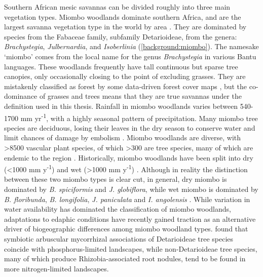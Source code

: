 \begin{refsection}
Southern African mesic savannas can be divided roughly into three main vegetation types. Miombo woodlands dominate southern Africa, and are the largest savanna vegetation type in the world by area \citep{Ryan2011}. They are dominated by species from the Fabaceae family, subfamily Detarioideae, from the genera: \textit{Brachystegia}, \textit{Julbernardia}, and \textit{Isoberlinia} (\autoref{background:miombo}). The namesake `miombo' comes from the local name for the genus \textit{Brachystegia} in various Bantu languages. These woodlands frequently have tall continuous but sparse tree canopies, only occasionally closing to the point of excluding grasses. They are mistakenly classified as forest by some data-driven forest cover maps \citep{Hansen2013}, but the co-dominance of grasses and trees means that they are true savannas under the definition used in this thesis. Rainfall in miombo woodlands varies between 540-1700 mm yr\textsuperscript{-1}, with a highly seasonal pattern of precipitation. Many miombo tree species are deciduous, losing their leaves in the dry season to conserve water and limit chances of damage by embolism \citep{Tomlinson2013}. Miombo woodlands are diverse, with >8500 vascular plant species, of which >300 are tree species, many of which are endemic to the region \citep{Frost1996}. Historically, miombo woodlands have been split into dry (<1000 mm y\textsuperscript{-1}) and wet (>1000 mm y\textsuperscript{-1}) \citep{White1983}. Although in reality the distinction between these two miombo types is clear cut, in general, dry miombo is dominated by \textit{B. spiciformis} and \textit{J. globiflora}, while wet miombo is dominated by \textit{B. floribunda}, \textit{B. longifolia}, \textit{J. paniculata} and \textit{I. angolensis} \citep{Frost1996}. While variation in water availability has dominated the classification of miombo woodlands, adaptations to edaphic conditions have recently gained traction as an alternative driver of biogeographic differences among miombo woodland types. \citet{Gomes2021} found that symbiotic arbuscular mycorrhizal associations of Detarioideae tree species coincide with phosphorus-limited landscapes, while non-Detarioideae tree species, many of which produce Rhizobia-associated root nodules, tend to be found in more nitrogen-limited landscapes.


\end{refsection}
